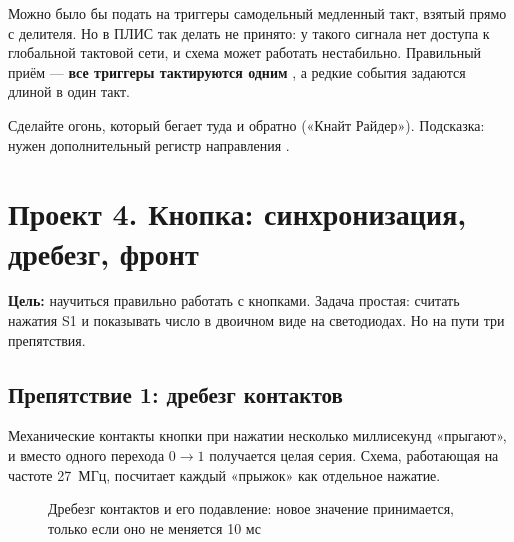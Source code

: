 \begin{infobox}
Можно было бы подать на триггеры самодельный медленный такт, взятый прямо с
делителя. Но в ПЛИС так делать не принято: у такого сигнала нет доступа к
глобальной тактовой сети, и схема может работать нестабильно. Правильный приём ---
\textbf{все триггеры тактируются одним }, а редкие события
задаются  длиной в один такт.
\end{infobox}

\begin{taskbox}
Сделайте огонь, который бегает туда и обратно («Кнайт Райдер»). Подсказка:
нужен дополнительный регистр направления .
\end{taskbox}

\section{Проект 4. Кнопка: синхронизация, дребезг, фронт}

\textbf{Цель:} научиться правильно работать с кнопками. Задача простая:
считать нажатия S1 и показывать число в двоичном виде на светодиодах. Но
на пути три препятствия.

\subsection{Препятствие 1: дребезг контактов}

Механические контакты кнопки при нажатии несколько миллисекунд «прыгают», и
вместо одного перехода $0\to1$ получается целая серия. Схема, работающая
на частоте 27~МГц, посчитает каждый «прыжок» как отдельное нажатие.

\begin{figure}[H]
\centering
{}
\caption{Дребезг контактов и его подавление: новое значение принимается, только
если оно не меняется 10 мс}
\end{figure}

